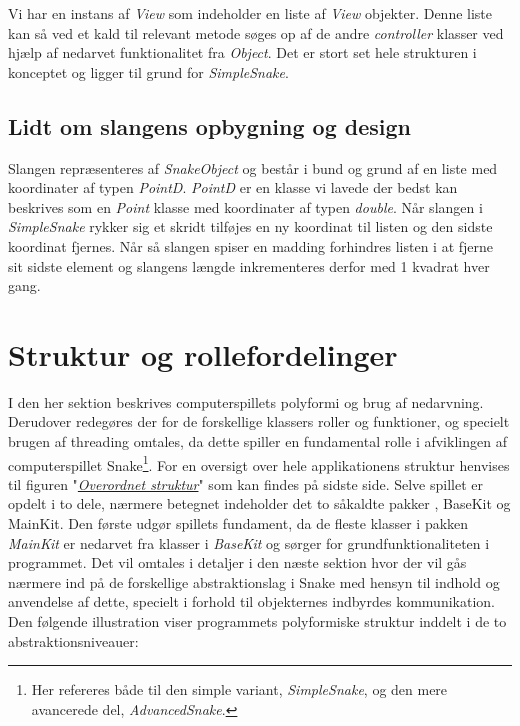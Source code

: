 \documentclass[]{article}
\begin{document}
Vi har en instans af \textit{View} som indeholder en liste af \textit{View} objekter. Denne liste kan så ved et kald til relevant metode søges op af de andre \textit{controller} klasser ved hjælp af nedarvet funktionalitet fra \textit{Object}. Det er stort set hele strukturen i konceptet og ligger til grund for \textit{SimpleSnake}.


\subsection{Lidt om slangens opbygning og design}

Slangen repræsenteres af \textit{SnakeObject} og består i bund og grund af en liste med koordinater af typen \textit{PointD}. \textit{PointD} er en klasse vi lavede der bedst kan beskrives som en \textit{Point} klasse med koordinater af typen \textit{double}. Når slangen i \textit{SimpleSnake} rykker sig et skridt tilføjes en ny koordinat til listen og den sidste koordinat fjernes. Når så slangen spiser en madding forhindres listen i at fjerne sit sidste element og slangens længde inkrementeres derfor med 1 kvadrat hver gang.


\section{Struktur og rollefordelinger}

I den her sektion beskrives computerspillets polyformi og brug af nedarvning. Derudover redegøres der for de forskellige klassers roller og funktioner, og specielt brugen af threading omtales, da dette spiller en fundamental rolle i afviklingen af computerspillet Snake\footnote{Her refereres både til den simple variant, \textit{SimpleSnake}, og den mere avancerede del, \textit{AdvancedSnake}.}. For en oversigt over hele applikationens struktur henvises til figuren "\textit{\hyperref[fig:structure]{Overordnet struktur}}" som kan findes på sidste side.
Selve spillet er opdelt i to dele, nærmere betegnet indeholder det to såkaldte pakker , BaseKit og MainKit. Den første udgør spillets fundament, da de fleste klasser i pakken \textit{MainKit} er nedarvet fra klasser i \textit{BaseKit} og sørger for grundfunktionaliteten i programmet. Det vil omtales i detaljer i den næste sektion hvor der vil gås nærmere ind på de forskellige abstraktionslag i Snake med hensyn til indhold og anvendelse af dette, specielt i forhold til objekternes indbyrdes kommunikation. Den følgende illustration viser programmets polyformiske struktur inddelt i de to abstraktionsniveauer:
\end{document}
